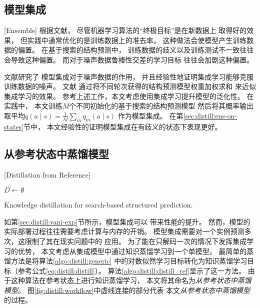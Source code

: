 \subsection{模型集成}[Ensemble]
根据文献，
尽管机器学习算法的``终极目标''是在新数据上
取得好的效果，
但实践中通常优化的是训练数据上的准去率。
这种做法会使模型产生训练数据的偏置。
在基于搜索的结构预测中，
训练数据的歧义以及训练测试不一致往往会导致这种偏置。
而对于噪声数据鲁棒性交差的学习目标
往往会加剧这种偏置。

文献研究了
模型集成对于噪声数据的作用，
并且经验性地证明集成学习能够克服训练数据的噪声。
文献
通过将不同轮次获得的结构预测模型权重加权求和
来近似集成学习的效果。
参考上述工作，本文考虑使用集成学习提升模型的泛化性。
在实践中，
本文训练$M$个不同初始化的基于搜索的结构预测模型
然后将其概率输出取平均$q(a \mid s) = \frac{1}{M} \sum_m q_m(a\mid s)$
作为模型集成。
在第\ref{sec:distill:ens-on-states}节中，
本文经验性的证明模型集成在有歧义的状态下表现更好。

\subsection{从参考状态中蒸馏模型}[Distillation from Reference]\label{sec:distill_ref}

\begin{algorithm}[t]
	$D \gets \emptyset$\; 
	\caption{Knowledge distillation for search-based structured prediction.}\label{algo:distill:distill_ref}
\end{algorithm}

如第\ref{sec:distill:vani-exp}节所示，模型集成可以
带来性能的提升。
然而，模型的实际部署过程往往需要考虑计算与内存的开销。
模型集成需要对一个实例预测多次，这限制了其在现实问题中的
应用。
为了能在只解码一次的情况下发挥集成学习的优势，
本文考虑从集成模型中通过知识蒸馏学习到一个单模型。
最简单的蒸馏方法是将算法\ref{algo:distill:generic}
中的对数似然学习目标转化为知识蒸馏学习目标（参考公式\ref{eq:distill:distill}）。
算法\ref{algo:distill:distill_ref}显示了这一方法。
由于这种算法在参考状态上进行知识蒸馏学习，
本文将其命名为\textit{从参考状态中蒸馏模型}。
图\ref{fig:distill:workflow}中虚线连接的部分代表
本文\textit{从参考状态中蒸馏模型}的过程。

